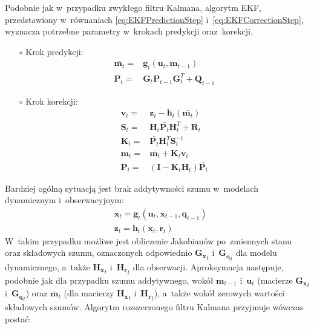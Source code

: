 Podobnie jak w~przypadku zwykłego filtru Kalmana, algorytm EKF, przedstawiony w~równaniach \ref{eq:EKFPredictionStep} i~\ref{eq:EKFCorrectionStep}, wyznacza potrzebne parametry w~krokach predykcji oraz~korekcji. \cite[48-51]{Thrun}
\begin{itemize}
	\item[$\circ$] Krok predykcji:
	\begin{align}\label{eq:EKFPredictionStep}
	\bar{\boldsymbol{m}_{t}} =& \boldsymbol{g}_t(\boldsymbol{u}_t, \boldsymbol{m}_{t-1}) \nonumber \\
	\bar{\mathbf{P}_{t}} =& \mathbf{G}_{t} \mathbf{P}_{t-1} \mathbf{G}_{t}^T + \mathbf{Q}_{t-1}
	\end{align}
	\item[$\circ$] Krok korekcji:
	\begin{align}\label{eq:EKFCorrectionStep}
	\mathbf{v}_t=&\mathbf{z}_t-\boldsymbol{h}_t(\bar{\boldsymbol{m}_{t}}) \nonumber \\
	\mathbf{S}_t=&\mathbf{H}_t \bar{\mathbf{P}_{t}} \mathbf{H}_t^T + \mathbf{R}_t \nonumber \\
	\mathbf{K}_t=&\bar{\mathbf{P}_{t}} \mathbf{H}_t^T \mathbf{S}_t^{-1}\nonumber \\
	\mathbf{m}_{t}=&\bar{\mathbf{m}_{t}} + \mathbf{K}_t \mathbf{v}_t\nonumber \\
	\mathbf{P}_{t}=&(\mathbf{I} - \mathbf{K}_t \mathbf{H}_t) \bar{\mathbf{P}_{t}}
	\end{align}
\end{itemize}
Bardziej ogólną sytuacją jest brak addytywności szumu w~modelach dynamicznym i~obserwacyjnym: \cite[71]{Sarka}
\begin{align}
	&\boldsymbol{x}_t = \boldsymbol{g}_t(\boldsymbol{u}_t, \boldsymbol{x}_{t-1}, \boldsymbol{q}_{t-1}) \nonumber \\
	&\boldsymbol{z}_t = \boldsymbol{h}_t(\boldsymbol{x}_{t}, \boldsymbol{r}_{t}) \label{eq:NonAdditiveNoiseModel}
\end{align}
W~takim przypadku możliwe jest obliczenie Jakobianów po~zmiennych stanu oraz składowych szumu, oznaczonych odpowiednio $\boldsymbol{G_x}_t$ i~$\boldsymbol{G_q}_t$ dla modelu dynamicznego, a~także $\boldsymbol{H_x}_t$ i~$\boldsymbol{H_r}_t$ dla obserwacji. Aproksymacja następuje, podobnie jak dla przypadku szumu addytywnego, wokół $\boldsymbol{m}_{t-1}$ i~$\boldsymbol{u}_{t}$ (macierze $\mathbf{G_x}_{t}$ i~$\mathbf{G_q}_{t}$) oraz $\bar{\boldsymbol{m}}_{t}$ (dla macierzy $\mathbf{H_x}_{t}$ i~$\mathbf{H_r}_{t}$), a~także wokół zerowych wartości składowych szumów. Algorytm rozszerzonego filtru Kalmana przyjmuje wówczas postać:

